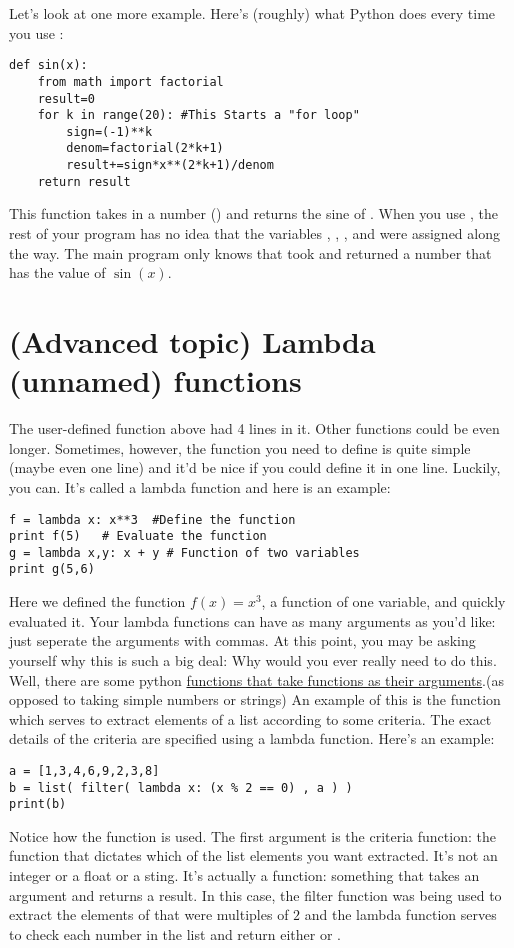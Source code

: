 Let's look at one more example.  Here's (roughly) what Python does every time you use :
\begin{Verbatim}
def sin(x):
    from math import factorial
    result=0
    for k in range(20): #This Starts a "for loop"
        sign=(-1)**k
        denom=factorial(2*k+1)
        result+=sign*x**(2*k+1)/denom
    return result
\end{Verbatim}
This function takes in a number () and returns the sine of .  When you use , the rest of your program has no idea that the variables , , , and  were assigned along the way.  The main program only knows that  took  and returned a number that has the value of $\sin(x)$.


\section{(Advanced topic) Lambda (unnamed) functions}
The user-defined function  above had 4 lines in it.  Other functions
could be even longer.  Sometimes, however, the function you need to
define is quite simple (maybe even one line) and it'd be nice if you
could define it in one line.  Luckily, you can.  It's
called a lambda function and here is an example:
\begin{Verbatim}
f = lambda x: x**3  #Define the function
print f(5)   # Evaluate the function
g = lambda x,y: x + y # Function of two variables
print g(5,6)
\end{Verbatim}
Here we defined the function $f(x) = x^3$, a function of one variable,
and quickly evaluated it.  Your lambda functions can have as many
arguments as you'd like: just seperate the arguments with commas.  At
this point, you may be asking yourself why this is such a big deal:
Why would you ever really need to do this.  Well, there are some
python \underline{functions that take functions as their
  arguments}.(as opposed
to taking simple numbers or strings) An example of this is the
 function which serves to extract elements of a list
according to some criteria.  The exact details of the criteria are
specified using a lambda function.  Here's an example:
\begin{Verbatim}
a = [1,3,4,6,9,2,3,8]
b = list( filter( lambda x: (x % 2 == 0) , a ) )
print(b)
\end{Verbatim}
Notice how the  function is used.  The first argument
is the criteria function: the function that dictates which of the list
elements you want extracted. It's not an integer or a float or a
sting.  It's actually a function: something that takes an argument and
returns a result.  In this case, the filter function was being used to
extract the elements of  that were multiples of $2$ and the
lambda function serves to check each number in the list and return
either  or .

